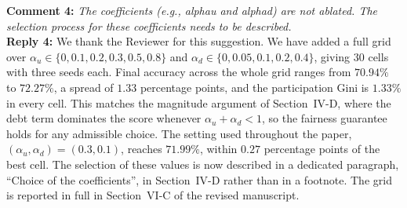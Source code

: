 \documentclass[10pt]{article}
\begin{document}
\noindent
\textbf{Comment 4:} \textit{The coefficients (e.g., alphau and alphad) are not ablated. The selection process for these coefficients needs to be described.} \\
\noindent
\textbf{Reply 4:} {We thank the Reviewer for this suggestion. We have added a full grid over $\alpha_u \in \{0, 0.1, 0.2, 0.3, 0.5, 0.8\}$ and $\alpha_d \in \{0, 0.05, 0.1, 0.2, 0.4\}$, giving $30$ cells with three seeds each. Final accuracy across the whole grid ranges from $70.94\%$ to $72.27\%$, a spread of $1.33$ percentage points, and the participation Gini is $1.33\%$ in every cell. This matches the magnitude argument of Section~IV-D, where the debt term dominates the score whenever $\alpha_u + \alpha_d < 1$, so the fairness guarantee holds for any admissible choice. The setting used throughout the paper, $(\alpha_u, \alpha_d) = (0.3, 0.1)$, reaches $71.99\%$, within $0.27$ percentage points of the best cell. The selection of these values is now described in a dedicated paragraph, ``Choice of the coefficients'', in Section~IV-D rather than in a footnote. The grid is reported in full in Section~VI-C of the revised manuscript.}\\
\end{document}

